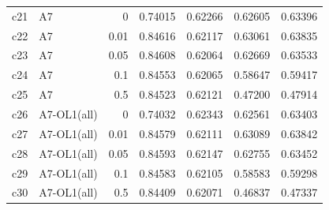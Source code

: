 \begin{tabular}{@{}llrrrrr@{}}
\addlinespace[2pt]
c21 & A7 & 0 & 0.74015 & 0.62266 & 0.62605 & 0.63396 \\
c22 & A7 & 0.01 & 0.84616 & 0.62117 & 0.63061 & 0.63835 \\
c23 & A7 & 0.05 & 0.84608 & 0.62064 & 0.62669 & 0.63533 \\
c24 & A7 & 0.1 & 0.84553 & 0.62065 & 0.58647 & 0.59417 \\
c25 & A7 & 0.5 & 0.84523 & 0.62121 & 0.47200 & 0.47914 \\
\addlinespace[2pt]
c26 & A7-OL1(all) & 0 & 0.74032 & 0.62343 & 0.62561 & 0.63403 \\
c27 & A7-OL1(all) & 0.01 & 0.84579 & 0.62111 & 0.63089 & 0.63842 \\
c28 & A7-OL1(all) & 0.05 & 0.84593 & 0.62147 & 0.62755 & 0.63452 \\
c29 & A7-OL1(all) & 0.1 & 0.84583 & 0.62105 & 0.58583 & 0.59298 \\
c30 & A7-OL1(all) & 0.5 & 0.84409 & 0.62071 & 0.46837 & 0.47337 \\
\bottomrule
\end{tabular}
